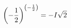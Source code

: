 \documentclass[12pt]{amsart}
\theoremstyle{plain} %
\theoremstyle{definition}
\theoremstyle{remark}
\begin{document}
\title{}
\author{Andrew Robbins}
\date{}
\begin{align}\notag \left(-\frac{1}{2}\right)^{\left(-\frac{1}{2}\right)} = -I\sqrt{2} \end{align}
\end{document}
